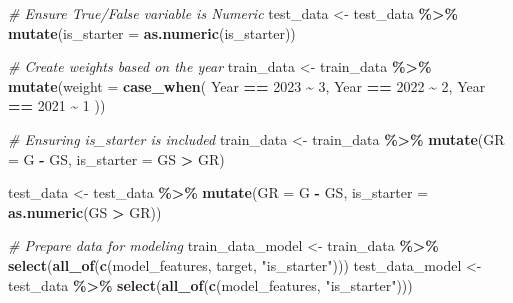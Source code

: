 \documentclass[
]{article}
\newenvironment{Shaded}{\begin{snugshade}}{\end{snugshade}}
\newcommand{\AttributeTok}[1]{\textcolor[rgb]{0.13,0.29,0.53}{#1}}
\newcommand{\CommentTok}[1]{\textcolor[rgb]{0.56,0.35,0.01}{\textit{#1}}}
\newcommand{\DecValTok}[1]{\textcolor[rgb]{0.00,0.00,0.81}{#1}}
\newcommand{\FunctionTok}[1]{\textcolor[rgb]{0.13,0.29,0.53}{\textbf{#1}}}
\newcommand{\NormalTok}[1]{#1}
\newcommand{\OtherTok}[1]{\textcolor[rgb]{0.56,0.35,0.01}{#1}}
\newcommand{\SpecialCharTok}[1]{\textcolor[rgb]{0.81,0.36,0.00}{\textbf{#1}}}
\newcommand{\StringTok}[1]{\textcolor[rgb]{0.31,0.60,0.02}{#1}}
\begin{document}
\begin{Shaded}
\begin{Highlighting}[]
\CommentTok{\# Ensure True/False variable is Numeric }
\NormalTok{test\_data }\OtherTok{\textless{}{-}}\NormalTok{ test\_data }\SpecialCharTok{\%\textgreater{}\%}
  \FunctionTok{mutate}\NormalTok{(}\AttributeTok{is\_starter =} \FunctionTok{as.numeric}\NormalTok{(is\_starter))}
\end{Highlighting}
\end{Shaded}

\begin{Shaded}
\begin{Highlighting}[]
\CommentTok{\# Create weights based on the year}
\NormalTok{train\_data }\OtherTok{\textless{}{-}}\NormalTok{ train\_data }\SpecialCharTok{\%\textgreater{}\%}
  \FunctionTok{mutate}\NormalTok{(}\AttributeTok{weight =} \FunctionTok{case\_when}\NormalTok{(}
\NormalTok{    Year }\SpecialCharTok{==} \DecValTok{2023} \SpecialCharTok{\textasciitilde{}} \DecValTok{3}\NormalTok{,}
\NormalTok{    Year }\SpecialCharTok{==} \DecValTok{2022} \SpecialCharTok{\textasciitilde{}} \DecValTok{2}\NormalTok{,}
\NormalTok{    Year }\SpecialCharTok{==} \DecValTok{2021} \SpecialCharTok{\textasciitilde{}} \DecValTok{1}
\NormalTok{  ))}
\end{Highlighting}
\end{Shaded}

\begin{Shaded}
\begin{Highlighting}[]
\CommentTok{\# Ensuring is\_starter is included}
\NormalTok{train\_data }\OtherTok{\textless{}{-}}\NormalTok{ train\_data }\SpecialCharTok{\%\textgreater{}\%}
  \FunctionTok{mutate}\NormalTok{(}\AttributeTok{GR =}\NormalTok{ G }\SpecialCharTok{{-}}\NormalTok{ GS,}
         \AttributeTok{is\_starter =}\NormalTok{ GS }\SpecialCharTok{\textgreater{}}\NormalTok{ GR)}

\NormalTok{test\_data }\OtherTok{\textless{}{-}}\NormalTok{ test\_data }\SpecialCharTok{\%\textgreater{}\%}
  \FunctionTok{mutate}\NormalTok{(}\AttributeTok{GR =}\NormalTok{ G }\SpecialCharTok{{-}}\NormalTok{ GS,}
         \AttributeTok{is\_starter =} \FunctionTok{as.numeric}\NormalTok{(GS }\SpecialCharTok{\textgreater{}}\NormalTok{ GR))}
\end{Highlighting}
\end{Shaded}

\begin{Shaded}
\begin{Highlighting}[]
\CommentTok{\# Prepare data for modeling}
\NormalTok{train\_data\_model }\OtherTok{\textless{}{-}}\NormalTok{ train\_data }\SpecialCharTok{\%\textgreater{}\%} \FunctionTok{select}\NormalTok{(}\FunctionTok{all\_of}\NormalTok{(}\FunctionTok{c}\NormalTok{(model\_features, target, }\StringTok{"is\_starter"}\NormalTok{)))}
\NormalTok{test\_data\_model }\OtherTok{\textless{}{-}}\NormalTok{ test\_data }\SpecialCharTok{\%\textgreater{}\%} \FunctionTok{select}\NormalTok{(}\FunctionTok{all\_of}\NormalTok{(}\FunctionTok{c}\NormalTok{(model\_features, }\StringTok{"is\_starter"}\NormalTok{)))}
\end{Highlighting}
\end{Shaded}
\end{document}

